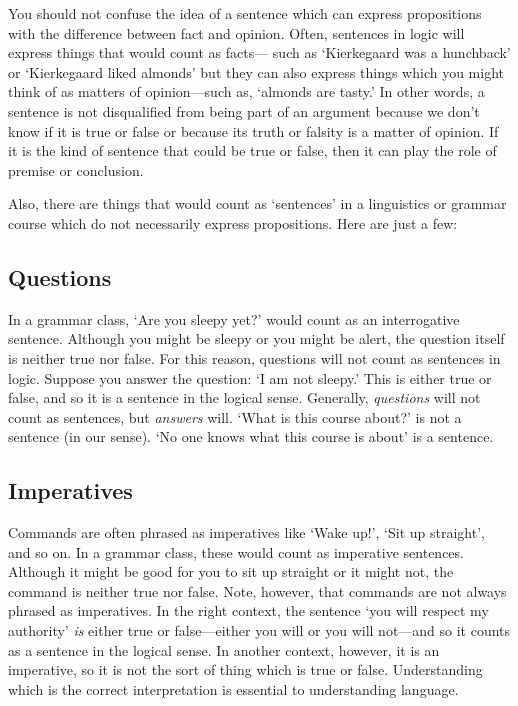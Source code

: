 You should not confuse the idea of a sentence which can express propositions with the difference between fact and opinion. Often, sentences in logic will express things that would count as facts— such as ‘Kierkegaard was a hunchback’ or ‘Kierkegaard liked almonds’ but they can also express things which you might think of as matters of opinion—such as, ‘almonds are tasty.’ In other words, a sentence is not disqualified from being part of an argument because we don’t know if it is true or false or because its truth or falsity is a matter of opinion. If it is the kind of sentence that could be true or false, then it can play the role of premise or conclusion.

Also, there are things that would count as ‘sentences’ in a linguistics or grammar course which do not necessarily express propositions. Here are just a few:

\subsection{Questions} In a grammar class, `Are you sleepy yet?' would count as an interrogative sentence. Although you might be sleepy or you might be alert, the question itself is neither true nor false. For this reason, questions will not count as sentences in logic. Suppose you answer the question: `I am not sleepy.' This is either true or false, and so it is a sentence in the logical sense. Generally, \emph{questions} will not count as sentences, but \emph{answers} will. `What is this course about?' is not a sentence (in our sense). `No one knows what this course is about' is a sentence. 

\subsection{Imperatives} Commands are often phrased as imperatives like `Wake up!', `Sit up straight', and so on. In a grammar class, these would count as imperative sentences. Although it might be good for you to sit up straight or it might not, the command is neither true nor false. Note, however, that commands are not always phrased as imperatives. In the right context, the sentence `you will respect my authority' \emph{is} either true or false---either you will or you will not---and so it counts as a sentence in the logical sense. In another context, however, it is an imperative, so it is not the sort of thing which is true or false. Understanding which is the correct interpretation is essential to understanding language.  

